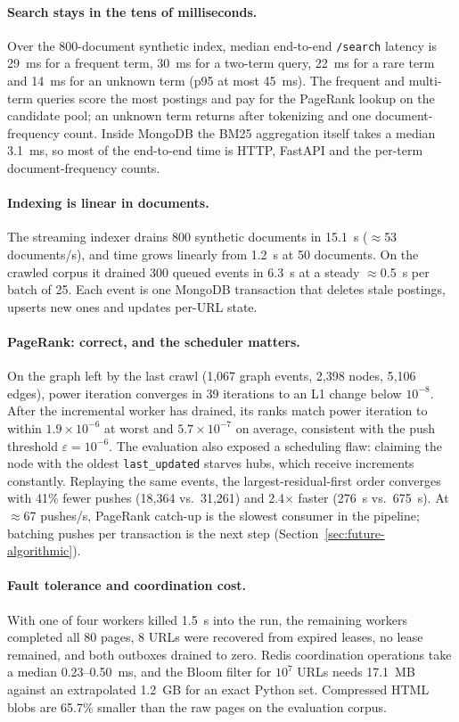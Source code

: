 \documentclass[11pt,a4paper]{article}
\newcommand{\code}[1]{\texttt{#1}}
\begin{document}
\paragraph{Search stays in the tens of milliseconds.} Over the 800-document synthetic index, median end-to-end \code{/search} latency is 29~ms for a frequent term, 30~ms for a two-term query, 22~ms for a rare term and 14~ms for an unknown term (p95 at most 45~ms). The frequent and multi-term queries score the most postings and pay for the PageRank lookup on the candidate pool; an unknown term returns after tokenizing and one document-frequency count. Inside MongoDB the BM25 aggregation itself takes a median 3.1~ms, so most of the end-to-end time is HTTP, FastAPI and the per-term document-frequency counts.

\paragraph{Indexing is linear in documents.} The streaming indexer drains 800 synthetic documents in 15.1~s ($\approx$53 documents/s), and time grows linearly from 1.2~s at 50 documents. On the crawled corpus it drained 300 queued events in 6.3~s at a steady $\approx$0.5~s per batch of 25. Each event is one MongoDB transaction that deletes stale postings, upserts new ones and updates per-URL state.

\paragraph{PageRank: correct, and the scheduler matters.} On the graph left by the last crawl (1{,}067 graph events, 2{,}398 nodes, 5{,}106 edges), power iteration converges in 39 iterations to an L1 change below $10^{-8}$. After the incremental worker has drained, its ranks match power iteration to within $1.9\times10^{-6}$ at worst and $5.7\times10^{-7}$ on average, consistent with the push threshold $\varepsilon = 10^{-6}$. The evaluation also exposed a scheduling flaw: claiming the node with the oldest \code{last\_updated} starves hubs, which receive increments constantly. Replaying the same events, the largest-residual-first order converges with 41\% fewer pushes (18{,}364 vs.\ 31{,}261) and 2.4$\times$ faster (276~s vs.\ 675~s). At $\approx$67 pushes/s, PageRank catch-up is the slowest consumer in the pipeline; batching pushes per transaction is the next step (Section~\ref{sec:future-algorithmic}).

\paragraph{Fault tolerance and coordination cost.} With one of four workers killed 1.5~s into the run, the remaining workers completed all 80 pages, 8 URLs were recovered from expired leases, no lease remained, and both outboxes drained to zero. Redis coordination operations take a median 0.23--0.50~ms, and the Bloom filter for $10^7$ URLs needs 17.1~MB against an extrapolated 1.2~GB for an exact Python set. Compressed HTML blobs are 65.7\% smaller than the raw pages on the evaluation corpus.
\end{document}
